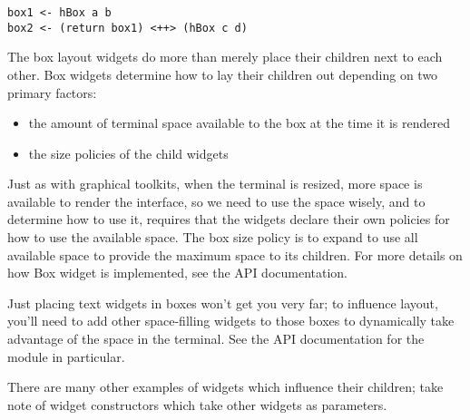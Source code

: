 \begin{verbatim}
box1 <- hBox a b
box2 <- (return box1) <++> (hBox c d)
\end{verbatim}

The box layout widgets do more than merely place their children next to
each other.  Box widgets determine how to lay their children out
depending on two primary factors:

\begin{itemize}
\item the amount of terminal space available to the box at the time it
      is rendered
\item the size policies of the child widgets
\end{itemize}

Just as with graphical toolkits, when the terminal is resized, more
space is available to render the interface, so we need to use the
space wisely, and to determine how to use it,  requires
that the widgets declare their own policies for how to use the
available space.  The box size policy is to expand to use all
available space to provide the maximum space to its children.  For
more details on how Box widget is implemented, see the API
documentation.

Just placing text widgets in boxes won't get you very far; to
influence layout, you'll need to add other space-filling widgets to
those boxes to dynamically take advantage of the space in the
terminal.  See the API documentation for the  module in
particular.

There are many other examples of widgets which influence their children;
take note of widget constructors which take other widgets as parameters.
